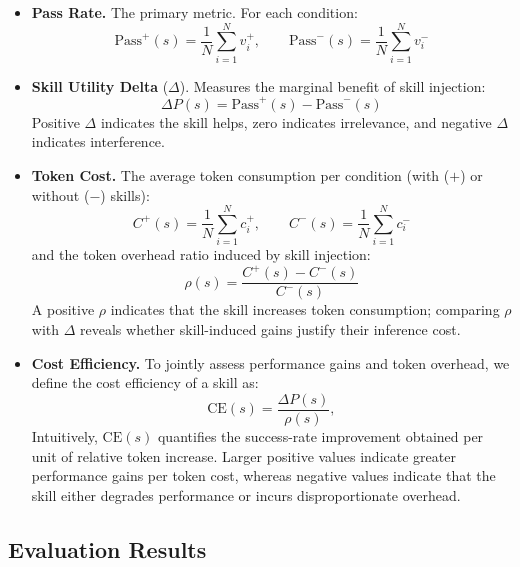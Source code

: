 \documentclass{article}
\begin{document}
\begin{itemize}[leftmargin=*]
    \item \textbf{Pass Rate.} The primary metric. For each condition:
    \begin{equation}
        \text{Pass}^{+}(s) = \frac{1}{N}\sum_{i=1}^{N} v_i^{+}, \qquad \text{Pass}^{-}(s) = \frac{1}{N}\sum_{i=1}^{N} v_i^{-}
    \end{equation}

    \item \textbf{Skill Utility Delta} ($\Delta$). Measures the marginal benefit of skill injection:
    \begin{equation}
        \Delta P(s) = \text{Pass}^{+}(s) - \text{Pass}^{-}(s)
    \end{equation}
    Positive $\Delta$ indicates the skill helps, zero indicates irrelevance, and negative $\Delta$ indicates interference.

    \item \textbf{Token Cost.} The average token consumption per condition (with ($+$) or without ($-$) skills):
    \begin{equation}
        C^{+}(s) = \frac{1}{N}\sum_{i=1}^{N} c_i^{+}, \qquad C^{-}(s) = \frac{1}{N}\sum_{i=1}^{N} c_i^{-}
    \end{equation}
    and the token overhead ratio induced by skill injection:
    \begin{equation}
        \rho(s) = \frac{C^{+}(s) - C^{-}(s)}{C^{-}(s)}
    \end{equation}
    A positive $\rho$ indicates that the skill increases token consumption; comparing $\rho$ with $\Delta$ reveals whether skill-induced gains justify their inference cost.

    \item \textbf{Cost Efficiency.} To jointly assess performance gains and token overhead, we define the cost efficiency of a skill as:
    \begin{equation}
    \mathrm{CE}(s) = \frac{\Delta P(s)}{\rho(s)},
    \end{equation}
    Intuitively, $\mathrm{CE}(s)$ quantifies the success-rate improvement obtained per unit of relative token increase. Larger positive values indicate greater performance gains per token cost, whereas negative values indicate that the skill either degrades performance or incurs disproportionate overhead. 
\end{itemize}

\subsection{Evaluation Results}
\end{document}
